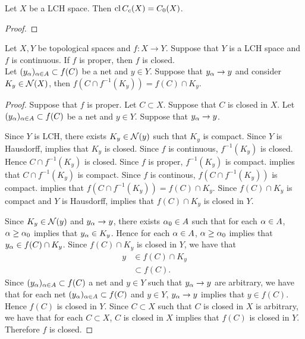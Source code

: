 \documentclass{book}
\begin{document}
\begin{ex} 
	Let $X$ be a LCH space. Then $\operatorname{cl} C_c(X) = C_0(X)$. 
\end{ex}

\begin{proof}
\end{proof}

	
\begin{ex}
	Let $X, Y$ be topological spaces and $f: X \rightarrow Y$. Suppose that $Y$ is a LCH space and $f$ is continuous. If $f$ is proper, then $f$ is closed. \\
	 Let $(y_{\alpha})_{\alpha \in A} \subset f(C)$ be a net and $y \in Y$. Suppose that $y_{\alpha} \rightarrow y$ and consider $K_y \in \mathcal{N}(X)$, then $f(C \cap f^{-1}(K_y)) = f(C) \cap K_{y}$.
\end{ex}

\begin{proof}
	Suppose that $f$ is proper. Let $C \subset X$. Suppose that $C$ is closed in $X$. Let $(y_{\alpha})_{\alpha \in A} \subset f(C)$ be a net and $y \in Y$. Suppose that $y_{\alpha} \rightarrow y$. 
	
	Since $Y$ is LCH, there exists $K_y \in \mathcal{N}(y)$ such that $K_y$ is compact. Since $Y$ is Hausdorff,  implies that $K_y$ is closed. Since $f$ is continuous, $f^{-1}(K_y)$ is closed. Hence $C \cap f^{-1}(K_y)$ is closed. Since $f$ is proper, $f^{-1}(K_y)$ is compact.  implies that $C \cap f^{-1}(K_y)$ is compact. Since $f$ is continous, $f(C \cap f^{-1}(K_y))$ is compact.  implies that $f(C \cap f^{-1}(K_y)) = f(C) \cap K_y$. Since $f(C) \cap K_y$ is compact and $Y$ is Hausdorff,  implies that $f(C) \cap K_y$ is closed in $Y$.
	
	Since $K_y \in \mathcal{N}(y)$ and $y_{\alpha} \rightarrow y$, there exists $\alpha_0 \in A$ such that for each $\alpha \in A$, $\alpha \geq \alpha_0$ implies that $y_{\alpha} \in K_y$. Hence for each $\alpha \in A$, $\alpha \geq \alpha_0$ implies that $y_{\alpha} \in f(C) \cap K_y$. Since $f(C) \cap K_y$ is closed in $Y$, we have that
	\begin{align*}
		y 
		& \in f(C) \cap K_y \\
		& \subset f(C).
	\end{align*}
	Since $(y_{\alpha})_{\alpha \in A} \subset f(C)$ a net and $y \in Y$ such that $y_{\alpha} \rightarrow y$ are arbitrary, we have that for each net $(y_{\alpha})_{\alpha \in A} \subset f(C)$ and $y \in Y$,  $y_{\alpha} \rightarrow y$ implies that $y \in f(C)$. Hence $f(C)$ is closed in $Y$. Since $C \subset X$ such that $C$ is closed in $X$ is arbitrary, we have that for each $C \subset X$, $C$ is closed in $X$ implies that $f(C)$ is closed in $Y$. Therefore $f$ is closed.  
\end{proof}
	
\end{document}
